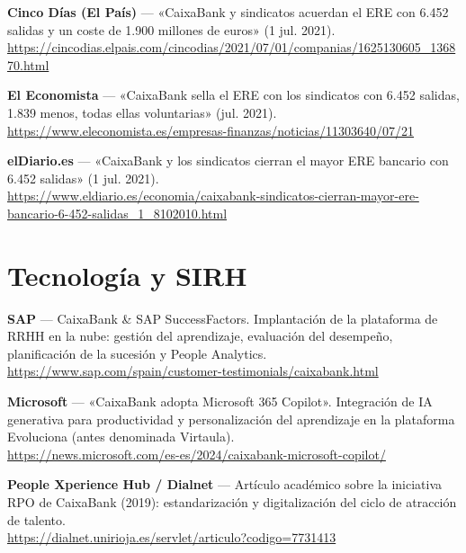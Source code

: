 \begin{enumerate}[label={[\arabic*]}, resume]

  \item \textbf{Cinco Días (El País)} --- «CaixaBank y sindicatos acuerdan el ERE
        con 6.452 salidas y un coste de 1.900 millones de euros» (1 jul. 2021).\\
        \url{https://cincodias.elpais.com/cincodias/2021/07/01/companias/1625130605_136870.html}

  \item \textbf{El Economista} --- «CaixaBank sella el ERE con los sindicatos
        con 6.452 salidas, 1.839 menos, todas ellas voluntarias» (jul. 2021).\\
        \url{https://www.eleconomista.es/empresas-finanzas/noticias/11303640/07/21}

  \item \textbf{elDiario.es} --- «CaixaBank y los sindicatos cierran el mayor
        ERE bancario con 6.452 salidas» (1 jul. 2021).\\
        \url{https://www.eldiario.es/economia/caixabank-sindicatos-cierran-mayor-ere-bancario-6-452-salidas_1_8102010.html}

\end{enumerate}

\section*{Tecnología y SIRH}

\begin{enumerate}[label={[\arabic*]}, resume]

  \item \textbf{SAP} --- CaixaBank \& SAP SuccessFactors. Implantación de la
        plataforma de RRHH en la nube: gestión del aprendizaje, evaluación del
        desempeño, planificación de la sucesión y People Analytics.\\
        \url{https://www.sap.com/spain/customer-testimonials/caixabank.html}

  \item \textbf{Microsoft} --- «CaixaBank adopta Microsoft 365 Copilot».
        Integración de IA generativa para productividad y personalización del
        aprendizaje en la plataforma Evoluciona (antes denominada Virtaula).\\
        \url{https://news.microsoft.com/es-es/2024/caixabank-microsoft-copilot/}

  \item \textbf{People Xperience Hub / Dialnet} --- Artículo académico sobre
        la iniciativa RPO de CaixaBank (2019): estandarización y digitalización
        del ciclo de atracción de talento.\\
        \url{https://dialnet.unirioja.es/servlet/articulo?codigo=7731413}

\end{enumerate}

